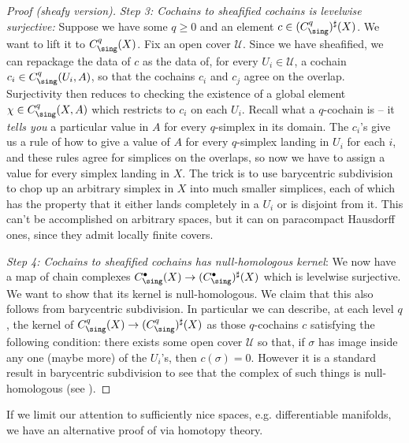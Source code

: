 \documentclass[11pt]{book}
\begin{document}
\begin{proof}[Proof (sheafy version)]
\emph{Step 3: Cochains to sheafified cochains is levelwise surjective:} Suppose we have some $q\ge 0$ and an element $c\in (C^q_\sing)^\sharp(X)$. We want to lift it to $C^q_\sing(X)$. Fix an open cover $\mathcal{U}$. Since we have sheafified, we can repackage the data of $c$ as the data of, for every $U_i \in \mathcal{U}$, a cochain $c_i \in C^q_\sing(U_i,A)$, so that the cochains $c_i$ and $c_j$ agree on the overlap. Surjectivity then reduces to checking the existence of a global element $\chi \in C^q_\sing(X,A)$ which restricts to $c_i$ on each $U_i$. Recall what a $q$-cochain is -- it \emph{tells you} a particular value in $A$ for every $q$-simplex in its domain. The $c_i$'s give us a rule of how to give a value of $A$ for every $q$-simplex landing in $U_i$ for each $i$, and these rules agree for simplices on the overlaps, so now we have to assign a value for every simplex landing in $X$. The trick is to use barycentric subdivision to chop up an arbitrary simplex in $X$ into much smaller simplices, each of which has the property that it either lands completely in a $U_i$ or is disjoint from it. This can't be accomplished on arbitrary spaces, but it can on paracompact Hausdorff ones, since they admit locally finite covers.

\emph{Step 4: Cochains to sheafified cochains has null-homologous kernel}: We now have a map of chain complexes $C^\bullet_\sing(X) \to (C_\sing^\bullet)^\sharp(X)$ which is levelwise surjective. We want to show that its kernel is null-homologous. We claim that this also follows from barycentric subdivision. In particular we can describe, at each level $q$, the kernel of $C^q_\sing(X) \to (C^q_\sing)^\sharp(X)$ as those $q$-cochains $c$ satisfying the following condition: there exists some open cover $\mathcal{U}$ so that, if $\sigma$ has image inside any one (maybe more) of the $U_i$'s, then $c(\sigma) = 0$. However it is a standard result in barycentric subdivision to see that the complex of such things is null-homologous (see \cite[2.21]{Hatcher}).
\end{proof}

If we limit our attention to sufficiently nice spaces, e.g. differentiable manifolds, we have an alternative proof of  via homotopy theory.
\end{document}
